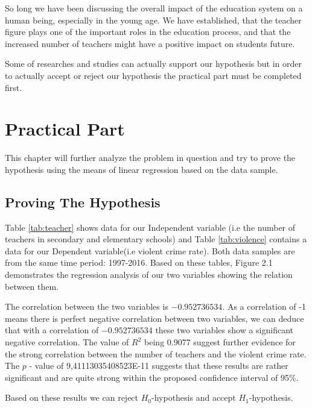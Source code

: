 \documentclass[thesis=B,english]{FITthesis}[2012/10/20]
\begin{document}
So long we have been discussing the overall impact of the education system on a human being, especially in the young age. We have established, that the teacher figure plays one of the important roles in the education process, and that the increased number of teachers might have a positive impact on students future.

 Some of researches and studies can actually support our hypothesis but in order to actually accept or reject our hypothesis the practical part must be completed first.
\chapter{Practical Part}
This chapter will further analyze the problem in question and try to prove the hypothesis  using the means of linear regression based on the data sample.

\section{Proving The Hypothesis}
Table \ref{tab:teacher} shows data for our Independent variable (i.e the number of teachers in secondary and elementary schools) and Table \ref{tab:violence} contains a data for our Dependent variable(i.e violent crime rate). Both data samples are from the same time period: 1997-2016. Based on these tables, Figure 2.1 demonstrates the regression analysis of our two variables showing the relation between them. 

 The correlation between the two variables is $-0.952736534$. As a correlation of -1 means there is
perfect negative correlation between two variables, we can deduce that with a correlation of
$-0.952736534$ these two variables show a significant negative correlation. The value of $R^2$ being
0.9077  suggest further evidence for the strong correlation between the number of teachers and the violent crime rate. The $p$ - value of 9,41113035408523E-11 suggests that these results are rather
significant and are quite strong within the proposed confidence interval of 95\%. 

Based on these
results we can reject $H_0$-hypothesis and accept $H_1$-hypothesis.
\end{document}
